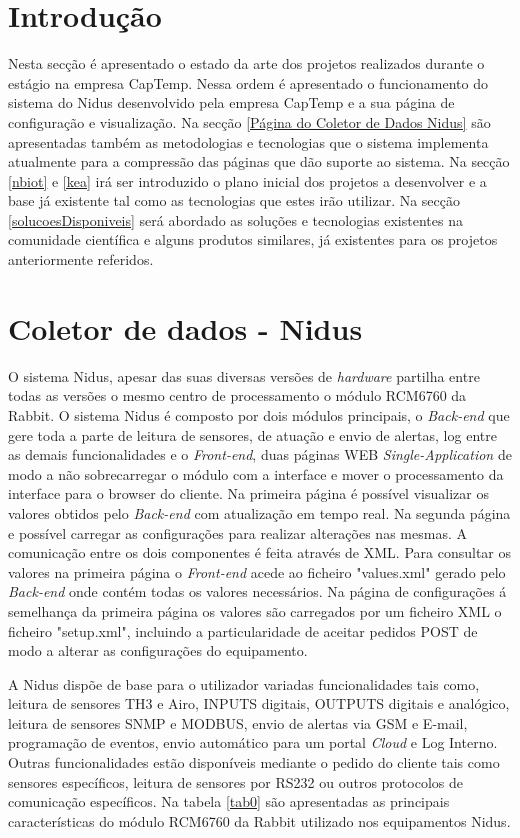 
\section{Introdução}
Nesta secção é apresentado o estado da arte dos projetos realizados durante o estágio na empresa CapTemp. Nessa ordem é apresentado o funcionamento do sistema do Nidus desenvolvido pela empresa CapTemp e a sua página de configuração e visualização. Na secção \ref{Página do Coletor de Dados Nidus} são apresentadas também as metodologias e tecnologias que o sistema implementa atualmente para a compressão das páginas que dão suporte ao sistema. Na secção \ref{nbiot} e \ref{kea} irá ser introduzido o plano inicial dos projetos a desenvolver e a base já existente tal como as tecnologias que estes irão utilizar. Na secção \ref{solucoesDisponiveis} será abordado as soluções e tecnologias existentes na comunidade científica e alguns produtos similares, já existentes para os projetos anteriormente referidos.

\section{Coletor de dados - Nidus} \label{Coletor de Dados - Nidus}
\par
O sistema Nidus, apesar das suas diversas versões de \textit{hardware} partilha entre todas as versões o mesmo centro de processamento o módulo RCM6760 da Rabbit. O sistema Nidus é composto por dois módulos principais, o \textit{Back-end} que gere toda a parte de leitura de sensores, de atuação e envio de alertas, log entre as demais funcionalidades e o \textit{Front-end}, duas páginas WEB \textit{Single-Application} de modo a não sobrecarregar o módulo com a interface e mover o processamento da interface para o browser do cliente. Na primeira página é possível visualizar os valores obtidos pelo \textit{Back-end} com atualização em tempo real. Na segunda página e possível carregar as configurações para realizar alterações nas mesmas. A comunicação entre os dois componentes é feita através de XML. Para consultar os valores na primeira página o \textit{Front-end} acede ao ficheiro "values.xml" gerado pelo \textit{Back-end} onde contém todas os valores necessários. Na página de configurações á semelhança da primeira página os valores são carregados por um ficheiro XML o ficheiro "setup.xml", incluindo a particularidade de aceitar pedidos POST de modo a alterar as configurações do equipamento.
\par A Nidus dispõe de base para o utilizador variadas funcionalidades tais como, leitura de sensores TH3 e Airo, INPUTS digitais, OUTPUTS digitais e analógico, leitura de sensores SNMP e MODBUS, envio de alertas via GSM e E-mail, programação de eventos, envio automático para um portal \textit{Cloud} e Log Interno. Outras funcionalidades estão disponíveis mediante o pedido do cliente tais como sensores específicos, leitura de sensores por RS232 ou outros protocolos de comunicação específicos.
Na tabela \ref{tab0} são apresentadas as principais características do módulo RCM6760 da Rabbit utilizado nos equipamentos Nidus.




